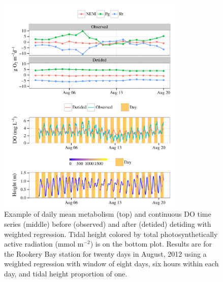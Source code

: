 \documentclass[letterpaper,12pt,oneside]{article}\usepackage[]{graphicx}\usepackage[]{color}
\newenvironment{knitrout}{}{} %
\begin{document}
\centering\vspace*{\fill}
\begin{knitrout}
\color{fgcolor}\begin{figure}[!ht]


{\centering \includegraphics[width=0.8\textwidth]{figure/case_ex1} 

}

\caption[Example of daily mean metabolism (top) and continuous \ac{DO} time series (middle) before (observed) and after (detided) detiding with weighted regression]{Example of daily mean metabolism (top) and continuous \ac{DO} time series (middle) before (observed) and after (detided) detiding with weighted regression. Tidal height colored by total photosynthetically active radiation (mmol m$^{-2}$) is on the bottom plot. Results are for the Rookery Bay station for twenty days in August, 2012 using a weighted regression with window of eight days, six hours within each day, and tidal height proportion of one.\label{fig:case_ex1}}
\end{figure}


\end{knitrout}
\vfill
\clearpage
\end{document}
